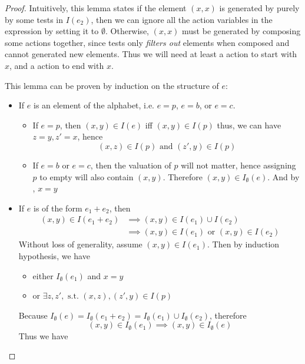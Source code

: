 \begin{proof}
    Intuitively, this lemma states
    if the element \((x, x)\) is generated by purely by some tests 
    in \(I(e_2)\),
    then we can ignore all the action variables in the expression by setting it to \(∅\).
    Otherwise, \((x, x)\) must be generated by composing some actions together,
    since tests only \emph{filters out} elements when composed 
    and cannot generated new elements.
    Thus we will need at least a action to start with \(x\), 
    and a action to end with \(x\).
    
    This lemma can be proven by induction on the structure of \(e\): 
    \begin{itemize}
        \item If \(e\) is an element of the alphabet, i.e. \(e = p\), \(e = b\), or \(e = c\).
        \begin{itemize}
        \item If \(e = p\), then \((x, y) ∈ I(e)\) 
            iff \((x, y) ∈ I(p)\)
            thus, we can have \(z = y, z' = x\), hence 
            \[(x, z) ∈ I(p)  \text{ and }  (z', y) ∈ I(p)\]
        \item If \(e = b\) or \(e = c\),
            then the valuation of \(p\) will not matter, 
            hence assigning \(p\) to empty will also contain \((x, y)\).
            Therefore \((x, y) ∈ I_∅(e)\).
            And by , \(x = y\)
        \end{itemize}
        \item If \(e\) is of the form \(e_1 + e_2\),
        then 
        \begin{align*}
            (x, y) ∈ I(e_1 + e_2)
            & ⟹ (x, y) ∈ I(e_1) ∪ I(e_2) \\
            & ⟹ (x, y) ∈ I(e_1) \text{ or } (x, y) ∈ I(e_2)
        \end{align*}
        Without loss of generality, assume \((x, y) ∈ I(e_1)\).
        Then by induction hypothesis, we have 
        \begin{itemize}[nosep]
            \item either \(I_∅(e_1)\) and \(x = y\)
            \item or \(∃ z, z', \text{ s.t. } (x, z), (z', y) ∈ I(p)\)
        \end{itemize}
        Because \(I_∅(e) = 
        I_∅(e_1 + e_2) = 
        I_∅(e_1) ∪ I_∅(e_2)\),
        therefore 
        \[(x, y) ∈ I_∅(e_1) ⟹ (x, y) ∈ I_∅(e)\]
        Thus we have
        \begin{itemize}[nosep]

\end{itemize}
\end{itemize}
\end{proof}
